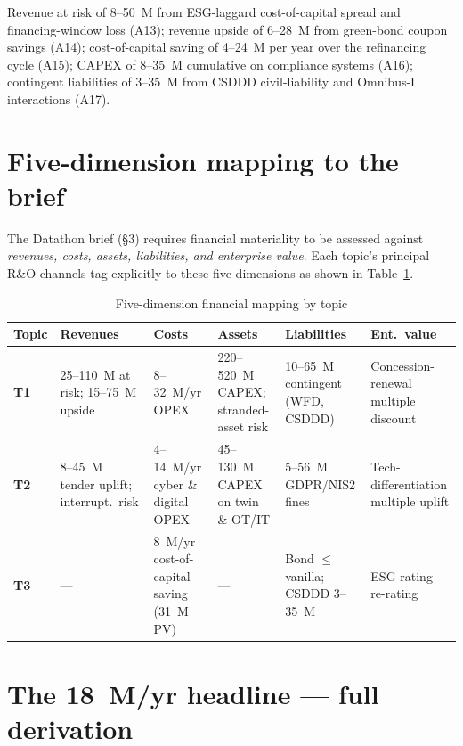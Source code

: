 \documentclass[11pt, a4paper, twoside, openright]{scrreprt}
\newcommand{\euro}{\texteuro}
\begin{document}
Revenue at risk of \euro{}8--50~M from ESG-laggard cost-of-capital spread and financing-window loss (A13); revenue upside of \euro{}6--28~M from green-bond coupon savings (A14); cost-of-capital saving of \euro{}4--24~M per year over the refinancing cycle (A15); CAPEX of \euro{}8--35~M cumulative on compliance systems (A16); contingent liabilities of \euro{}3--35~M from CSDDD civil-liability and Omnibus-I interactions (A17).

\section{Five-dimension mapping to the brief}

The Datathon brief (\S 3) requires financial materiality to be assessed against \emph{revenues, costs, assets, liabilities, and enterprise value}. Each topic's principal R\&O channels tag explicitly to these five dimensions as shown in Table~\ref{tab:fivedim}.

\begin{table}[h]
\caption{Five-dimension financial mapping by topic}
\label{tab:fivedim}
\centering
\small
\renewcommand{\arraystretch}{1.35}
\begin{tabular}{@{}p{1.3cm}p{2.9cm}p{2.6cm}p{2.8cm}p{2.4cm}p{2.5cm}@{}}
\toprule
\textbf{Topic} & \textbf{Revenues} & \textbf{Costs} & \textbf{Assets} & \textbf{Liabilities} & \textbf{Ent.\ value} \\
\midrule
\textbf{T1} & \euro{}25--110~M at risk; \euro{}15--75~M upside & \euro{}8--32~M/yr OPEX & \euro{}220--520~M CAPEX; stranded-asset risk & \euro{}10--65~M contingent (WFD, CSDDD) & Concession-renewal multiple discount \\[2pt]
\textbf{T2} & \euro{}8--45~M tender uplift; interrupt.\ risk & \euro{}4--14~M/yr cyber \& digital OPEX & \euro{}45--130~M CAPEX on twin \& OT/IT & \euro{}5--56~M GDPR/NIS2 fines & Tech-differentiation multiple uplift \\[2pt]
\textbf{T3} & --- & \euro{}8~M/yr cost-of-capital saving (\euro{}31~M PV) & --- & Bond $\leq$ vanilla; CSDDD \euro{}3--35~M & ESG-rating re-rating \\
\bottomrule
\end{tabular}
\end{table}

\section{The \euro{}18~M/yr headline --- full derivation}
\end{document}
